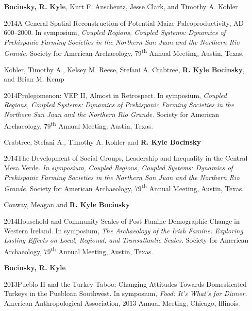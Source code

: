 {\bf Bocinsky, R. Kyle}, Kurt F. Anscheutz, Jesse Clark, and Timothy A. Kohler
\nopagebreak
\begin{list1}
\item[] 2014\hspace{.2cm}A General Spatial Reconstruction of Potential Maize Paleoproductivity, AD 600–2000. In symposium, \emph{Coupled Regions, Coupled Systems: Dynamics of Prehispanic Farming Societies in the Northern San Juan and the Northern Rio Grande.} Society for American Archaeology, 79\textsuperscript{th} Annual Meeting, Austin, Texas.
\end{list1}


Kohler, Timothy A., Kelsey M. Reese, Stefani A. Crabtree, {\bf R. Kyle Bocinsky}, and Brian M. Kemp
\nopagebreak
\begin{list1}
\item[] 2014\hspace{.2cm}Prolegomenon: VEP II, Almost in Retrospect. In symposium, \emph{Coupled Regions, Coupled Systems: Dynamics of Prehispanic Farming Societies in the Northern San Juan and the Northern Rio Grande.} Society for American Archaeology, 79\textsuperscript{th} Annual Meeting, Austin, Texas.
\end{list1}


Crabtree, Stefani A., Timothy A. Kohler and {\bf R. Kyle Bocinsky}
\nopagebreak
\begin{list1}
\item[] 2014\hspace{.2cm}The Development of Social Groups, Leadership and Inequality in the Central Mesa Verde. \emph{In symposium, Coupled Regions, Coupled Systems: Dynamics of Prehispanic Farming Societies in the Northern San Juan and the Northern Rio Grande.} Society for American Archaeology, 79\textsuperscript{th} Annual Meeting, Austin, Texas.
\end{list1}


Conway, Meagan and {\bf R. Kyle Bocinsky}
\nopagebreak
\begin{list1}
\item[] 2014\hspace{.2cm}Household and Community Scales of
Post-Famine Demographic Change in Western Ireland. In symposium, \emph{The Archaeology of the Irish Famine: Exploring Lasting Effects on Local, Regional, and Transatlantic Scales.} Society for American Archaeology, 79\textsuperscript{th} Annual Meeting, Austin, Texas.
\end{list1}


{\bf Bocinsky, R. Kyle}
\nopagebreak
\begin{list1}
\item[] 2013\hspace{.2cm}Pueblo II and the Turkey Taboo: Changing Attitudes Towards Domesticated Turkeys in the Puebloan Southwest. In symposium, \emph{Food: It's What's for Dinner.} American Anthropological Association, 2013 Annual Meeting, Chicago, Illinois.
\end{list1}


